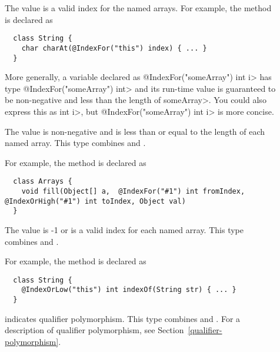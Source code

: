 \begin{description}
\item[]
  The value is a valid index for the named arrays.  For example, the
  method is declared as

  \begin{Verbatim}
  class String {
    char charAt(@IndexFor("this") index) { ... }
  }
  \end{Verbatim}

  More generally, a variable
  declared as \<@IndexFor("someArray") int i> has type
  \<@IndexFor("someArray") int> and its run-time value is guaranteed to be
  non-negative and less than the length of \<someArray>.  You could also
  express this as
  \<
  int i>,
  but \<@IndexFor("someArray") int i> is more concise.

 \item[]
   The value is non-negative and is less than or equal to the length of
   each named array.  This type combines
   and
  .

  For example, the
   method is declared as

  \begin{mysmall}
  \begin{Verbatim}
  class Arrays {
    void fill(Object[] a,  @IndexFor("#1") int fromIndex, @IndexOrHigh("#1") int toIndex, Object val)
  }
  \end{Verbatim}
  \end{mysmall}

 \item[]
   The value is -1 or is a valid index for
   each named array.  This type combines
   and
  .

  For example, the
  method is declared as

  \begin{Verbatim}
  class String {
    @IndexOrLow("this") int indexOf(String str) { ... }
  }
  \end{Verbatim}

 \item[]
   indicates qualifier polymorphism.  This type combines
    and
   .
   For a description of qualifier polymorphism, see
   Section~\ref{qualifier-polymorphism}.

\end{description}

